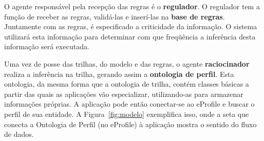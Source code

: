 O agente responsável pela recepção das regras é o \textbf{regulador}. O regulador tem a função de receber as regras, validá-las e inserí-las na \textbf{base de regras}. Juntamente com as regras, é especificado a criticidade da informação. O sistema utilizará esta informação para determinar com que freqüência a inferência desta informação será executada.

Uma vez de posse das trilhas, do modelo e das regras, o agente \textbf{raciocinador} realiza a inferência na trilha, gerando assim a \textbf{ontologia de perfil}. Esta ontologia, da mesma forma que a ontologia de trilha, contém classes básicas a partir das quais as aplicações vão especializar, utilizando-as para armazenar informações próprias. A aplicação pode então conectar-se ao eProfile e buscar o perfil de sua entidade. A Figura~\ref{fig:modelo} exemplifica isso, onde a seta que conecta a Ontologia de Perfil (no eProfile) à aplicação mostra o sentido do fluxo de dados.
